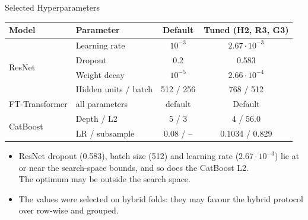 \documentclass[aspectratio=169,10pt]{beamer}
\begin{document}
\begin{frame}{Selected Hyperparameters}
\scriptsize
\centering

\setlength{\tabcolsep}{6pt}
\renewcommand{\arraystretch}{1.2}

\begin{tabular}{llcc}
\toprule
\textbf{Model} & \textbf{Parameter} & \textbf{Default} & \textbf{Tuned (H2, R3, G3)}\\
\midrule

\multirow{4}{*}{ResNet}
 & Learning rate & $10^{-3}$ & $2.67\cdot10^{-3}$\\
 & Dropout & 0.2 & 0.583\\
 & Weight decay & $10^{-5}$ & $2.66\cdot10^{-4}$\\
 & Hidden units / batch & 512 / 256 & 768 / 512\\

\midrule
FT-Transformer
 & all parameters & default & Default\\

\midrule
\multirow{2}{*}{CatBoost}
 & Depth / L2 & 5 / 3 & 4 / 56.0\\
 & LR / subsample & 0.08 / -- & 0.1034 / 0.829\\

\bottomrule
\end{tabular}

\vspace{0.6em}
\raggedright
\small
\begin{itemize}
  \item ResNet dropout (0.583), batch size (512) and learning rate ($2.67\cdot10^{-3}$) lie at or near the search-space bounds, and so does the CatBoost L2.\\ The optimum may be outside the search space.
  \item The values were selected on hybrid folds: they may favour the hybrid protocol over row-wise and grouped.
\end{itemize}
\end{frame}
\end{document}
